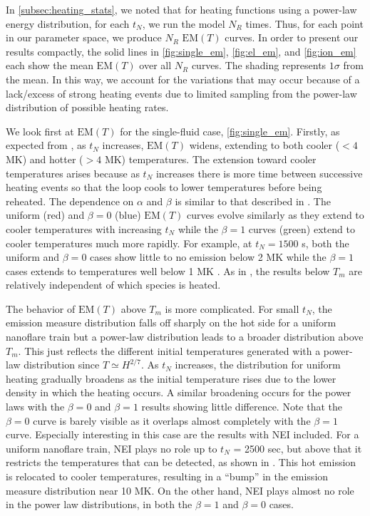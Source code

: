 \documentclass[preprint,linenumbers]{aastex}
\begin{document}
	\par In \autoref{subsec:heating_stats}, we noted that for heating functions using a power-law energy distribution, for each $t_N$, we run the model $N_R$ times. Thus, for each point in our parameter space, we produce $N_R$ $\mathrm{EM}(T)$ curves. In order to present our results compactly, the solid lines in \autoref{fig:single_em}, \autoref{fig:el_em}, and \autoref{fig:ion_em} each show the mean $\mathrm{EM}(T)$ over all $N_R$ curves. The shading represents $1\sigma$ from the mean. In this way, we account for the variations that may occur because of a lack/excess of strong heating events due to limited sampling from the power-law distribution of possible heating rates.
	\par We look first at $\mathrm{EM}(T)$ for the single-fluid case, \autoref{fig:single_em}. Firstly, as expected from \citet{cargill_active_2014}, as $t_N$ increases, $\mathrm{EM}(T)$ widens, extending to both cooler ($<4$ MK) and hotter ($>4$ MK) temperatures. The extension toward cooler temperatures arises because as $t_N$ increases there is more time between successive heating events so that the loop cools to lower temperatures before being reheated. The dependence on $\alpha$ and $\beta$ is similar to that described in \citet{cargill_active_2014}. The uniform (red) and $\beta=0$ (blue) $\mathrm{EM}(T)$ curves evolve similarly as they extend to cooler temperatures with increasing $t_N$ while the $\beta=1$ curves (green) extend to cooler temperatures much more rapidly. For example, at $t_N=1500$ s, both the uniform and $\beta=0$ cases show little to no emission below 2 MK while the $\beta=1$ cases extends to temperatures well below 1 MK \citep{cargill_active_2014}. As in , the results below $T_m$ are relatively independent of which species is heated.
	\par The behavior of $\mathrm{EM}(T)$ above $T_m$ is more complicated. For small $t_N$, the emission measure distribution falls off sharply on the hot side for a uniform nanoflare train but a power-law distribution leads to a broader distribution above $T_m$. This just reflects the different initial temperatures generated with a power-law distribution since $T \simeq H^{2/7}$. As $t_N$ increases, the distribution for uniform heating gradually broadens as the initial temperature rises due to the lower density in which the heating occurs. A similar broadening occurs for the power laws with the $\beta=0$ and $\beta=1$ results showing little difference. Note that the $\beta=0$ curve is barely visible as it overlaps almost completely with the $\beta=1$ curve. Especially interesting in this case are the results with NEI included. For a uniform nanoflare train, NEI plays no role up to $t_N$ = 2500 sec, but above that it restricts the temperatures that can be detected, as shown in . This hot emission is relocated to cooler temperatures, resulting in a ``bump'' in the emission measure distribution near 10 MK. On the other hand, NEI plays almost no role in the power law distributions, in both the $\beta=1$ and $\beta=0$ cases.
\end{document}
